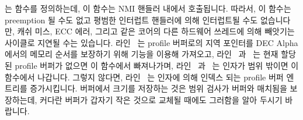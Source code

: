 \fi

\begin{fcvref}
 는  함수를 정의하는데, 이 함수는 NMI
핸들러 내에서 호출됩니다.
따라서, 이 함수는 preemption 될 수도 없고 평범한 인터럽트 핸들러에 의해
인터럽트될 수도 없습니다만, 캐쉬 미스, ECC 에러, 그리고 같은 코어의 다른
하드웨어 쓰레드에 의해 빼앗기는 사이클로 지연될 수는 있습니다.
라인~ 는 profile 버퍼로의 지역 포인터를 DEC Alpha 에서의
메모리 순서를 보장하기 위해  기능을 이용해 가져오고,
라인~ 과~ 는 현재 할당된 profile 버퍼가 없으면 이
함수에서 빠져나가며, 라인~ 과~ 는 
인자가 범위 밖이면 이 함수에서 나갑니다.
그렇지 않다면, 라인~ 는  인자에 의해 인덱스 되는 profile
버퍼 엔트리를 증가시킵니다.
버퍼에서 크기를 저장하는 것은 범위 검사가 버퍼와 매치됨을 보장하는데, 커다란
버퍼가 갑자기 작은 것으로 교체될 때에도 그러함을 알아 두시기 바랍니다.
\end{fcvref}

